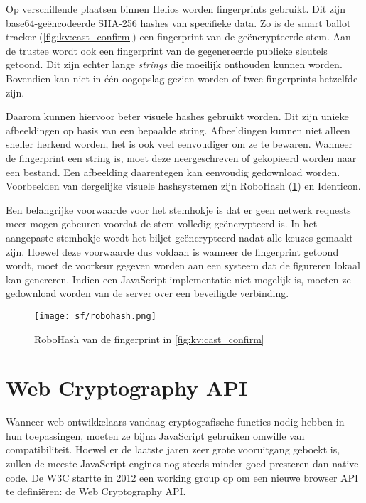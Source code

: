 Op verschillende plaatsen binnen Helios worden fingerprints gebruikt. Dit zijn base64-ge\"encodeerde SHA-256 hashes van specifieke data.\cite{fips_180_4} Zo is de smart ballot tracker (\ref{fig:kv:cast_confirm}) een fingerprint van de ge\"encrypteerde stem. Aan de trustee wordt ook een fingerprint van de gegenereerde publieke sleutels getoond. Dit zijn echter lange \textit{strings} die moeilijk onthouden kunnen worden. Bovendien kan niet in \'e\'en oogopslag gezien worden of twee fingerprints hetzelfde zijn.

\npar Daarom kunnen hiervoor beter visuele hashes gebruikt worden. Dit zijn unieke afbeeldingen op basis van een bepaalde string. Afbeeldingen kunnen niet alleen sneller herkend worden, het is ook veel eenvoudiger om ze te bewaren. Wanneer de fingerprint een string is, moet deze neergeschreven of gekopieerd worden naar een bestand. Een afbeelding daarentegen kan eenvoudig gedownload worden. Voorbeelden van dergelijke visuele hashsystemen zijn RoboHash (\ref{fig:sf:robohash}) en Identicon.\cite{site:robohash}\cite{wiki:identicon}

\npar Een belangrijke voorwaarde voor het stemhokje is dat er geen netwerk requests meer mogen gebeuren voordat de stem volledig ge\"encrypteerd is.\cite{adida_helios} In het aangepaste stemhokje wordt het biljet ge\"encrypteerd nadat alle keuzes gemaakt zijn. Hoewel deze voorwaarde dus voldaan is wanneer de fingerprint getoond wordt, moet de voorkeur gegeven worden aan een systeem dat de figureren lokaal kan genereren. Indien een JavaScript implementatie niet mogelijk is, moeten ze gedownload worden van de server over een beveiligde verbinding.

\begin{figure}
  \centering
  \texttt{[image: sf/robohash.png]}
  \caption{RoboHash van de fingerprint in \ref{fig:kv:cast_confirm}}
  \label{fig:sf:robohash}
\end{figure}

\section{Web Cryptography API}
\label{chap:web_cryptography_api}

Wanneer web ontwikkelaars vandaag cryptografische functies nodig hebben in hun toepassingen, moeten ze bijna JavaScript gebruiken omwille van compatibiliteit. Hoewel er de laatste jaren zeer grote vooruitgang geboekt is, zullen de meeste JavaScript engines nog steeds minder goed presteren dan native code.\cite{site:resig_javascript_performance_rundown}\cite{site:cois_javascript_performance_rundown_2012}\cite{smedberg_performance_analysis_of_javascript} De W3C startte in 2012 een working group op om een nieuwe browser API te defini\"eren: de Web Cryptography API.\cite{wiki:webcrypto}

